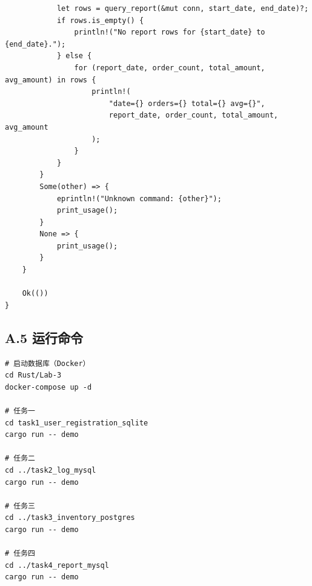 \documentclass[12pt,a4paper]{ctexart}
\begin{document}
\begin{lstlisting}
            let rows = query_report(&mut conn, start_date, end_date)?;
            if rows.is_empty() {
                println!("No report rows for {start_date} to {end_date}.");
            } else {
                for (report_date, order_count, total_amount, avg_amount) in rows {
                    println!(
                        "date={} orders={} total={} avg={}",
                        report_date, order_count, total_amount, avg_amount
                    );
                }
            }
        }
        Some(other) => {
            eprintln!("Unknown command: {other}");
            print_usage();
        }
        None => {
            print_usage();
        }
    }

    Ok(())
}

\end{lstlisting}

\subsection*{A.5 运行命令}
\begin{verbatim}
# 启动数据库（Docker）
cd Rust/Lab-3
docker-compose up -d

# 任务一
cd task1_user_registration_sqlite
cargo run -- demo

# 任务二
cd ../task2_log_mysql
cargo run -- demo

# 任务三
cd ../task3_inventory_postgres
cargo run -- demo

# 任务四
cd ../task4_report_mysql
cargo run -- demo
\end{verbatim}
\end{document}
